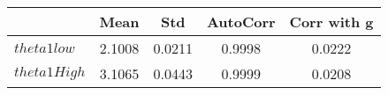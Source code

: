 \begin{tiny}\begin{tabular}{|l|c|c|c|c|}
\hline
&\textbf{Mean}&\textbf{Std}&\textbf{AutoCorr}&\textbf{Corr with g}\\\hline
\textbf{$theta1low$}&2.1008&0.0211&0.9998&0.0222\\\hline
\textbf{$theta1High$}&3.1065&0.0443&0.9999&0.0208\\\hline
\end{tabular}
\end{tiny}